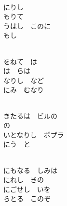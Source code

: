 \documentclass[10pt,b5j]{tarticle} %
\begin{document}
\vspace{1.5em} %
\newcommand{\linespace}{0.5em} %
\newcommand{\blocksize}{0.5\hsize} %
\newcommand{\itemmargin}{6em} %
\begin{enumerate} %
    \setlength{\itemindent}{\itemmargin} %
    \begin{minipage}[c]{\blocksize}
    
        \vspace{\linespace}
        \item~\\
        にりし　\\
        もりて　\\
        うはし　このに\\
        もし　
        
        \vspace{\linespace}
        \item~\\
        をねて　は\\
        は　らは\\
        なりし　など\\
        にみ　むなり
        
        \vspace{\linespace}
        \item~\\
        きたるは　ビルの\\
        の　　\\
        いとなりし　ポプラ\\
        にう　と
        
        \vspace{\linespace}
        \item~\\
        にもなる　しみは\\
        にれし　きの\\
        にごせし　いを\\
        らとる　このぞ
        

\end{minipage}
\end{enumerate}
\end{document}
